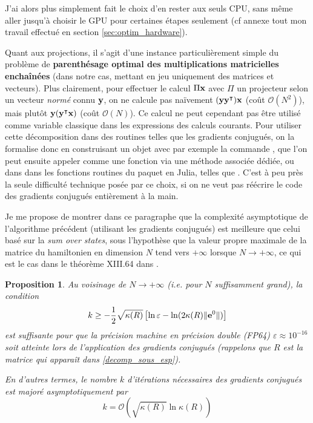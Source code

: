 \documentclass[svgnames,dvipsnames,a4paper,10pt,french]{report}
\newtheorem{proposition}[theorem]{Proposition}
\begin{document}
J'ai alors plus simplement fait le choix d'en rester aux seuls CPU, sans même aller jusqu'à choisir le GPU pour certaines étapes seulement (cf annexe tout mon travail effectué en section \ref{sec:optim_hardware}).


Quant aux projections, il s'agit d'une instance particulièrement simple du problème de \textbf{parenthésage optimal des multiplications matricielles enchaînées} (dans notre cas, mettant en jeu uniquement des matrices et vecteurs). Plus clairement, pour effectuer le calcul $\Pi \mathbf{x}$ avec $\Pi$ un projecteur selon un vecteur \emph{normé} connu $\mathbf{y}$, on ne calcule pas naïvement $(\mathbf{y} \mathbf{y}^\intercal) \mathbf{x}$ (coût $\mathcal{O}(N^2)$), mais plutôt $\mathbf{y} (\mathbf{y}^\intercal \mathbf{x})$ (coût $\mathcal{O}(N)$). Ce calcul ne peut cependant pas être utilisé comme variable classique dans les expressions des calculs courants. Pour utiliser cette décomposition dans des routines telles que les gradients conjugués, on la formalise donc en construisant un objet  avec par exemple la commande , que l'on peut ensuite appeler comme une fonction via une méthode associée dédiée, ou dans dans les fonctions routines du paquet  en Julia, telles que . C'est à peu près la seule \og difficulté technique \fg{} posée par ce choix, si on ne veut pas réécrire le code des gradients conjugués entièrement à la main.


Je me propose de montrer dans ce paragraphe que la complexité asymptotique de l'algorithme précédent (utilisant les gradients conjugués) est meilleure que celui basé sur la \emph{sum over states}, sous l'hypothèse que la valeur propre maximale de la matrice du hamiltonien en dimension $N$ tend vers $+\infty$ lorsque $N\rightarrow + \infty$, ce qui est le cas dans le théorème XIII.64 dans \cite{reed_methods_1980}. 


\begin{proposition}
Au voisinage de $N \rightarrow + \infty$ (i.e. pour $N$ suffisamment grand),  la condition 
\begin{equation}
\label{condition_precision_machine}
    k   \ge - \frac{1}{2}\sqrt{\kappa(R)} \left[\ln \varepsilon - \ln (2 \kappa (R) \| \mathbf{e}^0\|) \right]
\end{equation}
est suffisante pour que la précision machine en précision double (FP64) $\varepsilon \approx 10^{-16}$ soit atteinte lors de l'application des gradients conjugués (rappelons que $R$ est la matrice qui apparaît dans \ref{decomp_sous_esp}).


En d'autres termes, le nombre $k$ d'itérations nécessaires des gradients conjugués est majoré asymptotiquement par
\begin{equation}
    \boxed{k = \mathcal{O}\left( \sqrt{\kappa(R)} \ln \kappa(R)\right)}
\end{equation}
\end{proposition}
\end{document}
